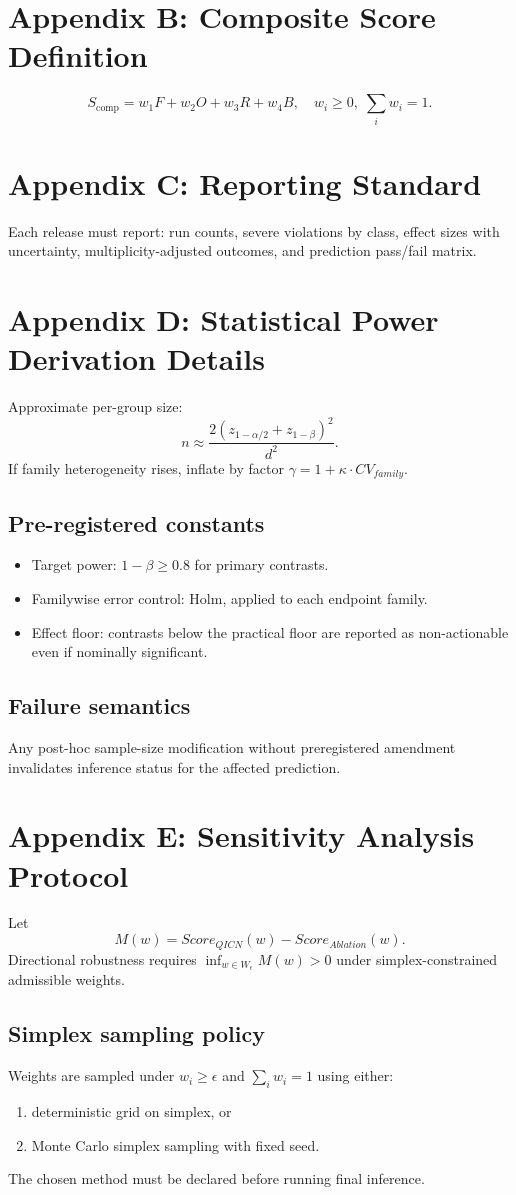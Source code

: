 \documentclass[11pt,a4paper]{article}
\theoremstyle{definition}
\begin{document}
\section{Appendix B: Composite Score Definition}
\[
S_{\mathrm{comp}}=w_1F+w_2O+w_3R+w_4B,\quad w_i\ge0,\;\sum_i w_i=1.
\]

\section{Appendix C: Reporting Standard}
Each release must report: run counts, severe violations by class, effect sizes with uncertainty, multiplicity-adjusted outcomes, and prediction pass/fail matrix.

\section{Appendix D: Statistical Power Derivation Details}
Approximate per-group size:
\[
n\approx \frac{2(z_{1-\alpha/2}+z_{1-\beta})^2}{d^2}.
\]
If family heterogeneity rises, inflate by factor $\gamma=1+\kappa\cdot CV_{family}$.
\subsection*{Pre-registered constants}
\begin{itemize}
\item Target power: $1-\beta \ge 0.8$ for primary contrasts.
\item Familywise error control: Holm, applied to each endpoint family.
\item Effect floor: contrasts below the practical floor are reported as non-actionable even if nominally significant.
\end{itemize}
\subsection*{Failure semantics}
Any post-hoc sample-size modification without preregistered amendment invalidates inference status for the affected prediction.

\section{Appendix E: Sensitivity Analysis Protocol}
Let
\[
M(w)=Score_{QICN}(w)-Score_{Ablation}(w).
\]
Directional robustness requires $\inf_{w\in W_\epsilon} M(w)>0$ under simplex-constrained admissible weights.
\subsection*{Simplex sampling policy}
Weights are sampled under $w_i\ge\epsilon$ and $\sum_i w_i=1$ using either:
\begin{enumerate}
\item deterministic grid on simplex, or
\item Monte Carlo simplex sampling with fixed seed.
\end{enumerate}
The chosen method must be declared before running final inference.
\end{document}
